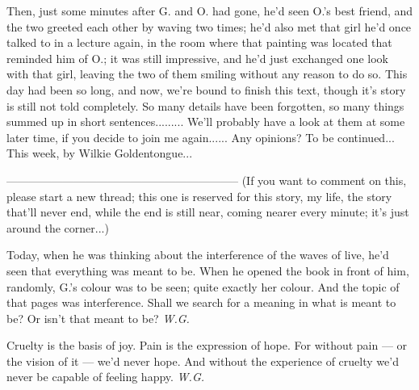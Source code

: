 Then, just some minutes after G. and O. had gone, he'd seen O.'s best friend, and the two greeted each other by waving two times; he'd also met that girl he'd once talked to in a lecture again, in the room where that painting was located that reminded him of O.; it was still impressive, and he'd just exchanged one look with that girl, leaving the two of them smiling without any reason to do so. 
This day had been so long, and now, we're bound to finish this text, though it's story is still not told completely. So many details have been forgotten, so many things summed up in short sentences.........
We'll probably have a look at them at some later time, if you decide to join me again......
Any opinions?
To be continued...
This week, by Wilkie Goldentongue...

--------------------------------------------------------------
(If you want to comment on this, please start a new thread; this one is reserved for this story, my life, the story that'll never end, while the end is still near, coming nearer every minute; it's just around the corner...)

Today, 
when he was thinking about the interference of the waves of live, 
he'd seen 
that everything 
was meant to be. 
When he opened the book in front of him, 
randomly, 
G.'s colour was to be seen; 
quite exactly her colour. 
And the topic of that pages was 
interference. 
Shall we search for a meaning 
in what is meant to be? 
Or isn't that meant to be? 
\emph{W.G.}

Cruelty 
is the basis of joy. 
Pain 
is the expression of hope. 
For without pain --- 
or the vision of it --- 
we'd never hope. 
And without the experience 
of cruelty 
we'd never be capable 
of feeling happy. 
\emph{W.G.}
